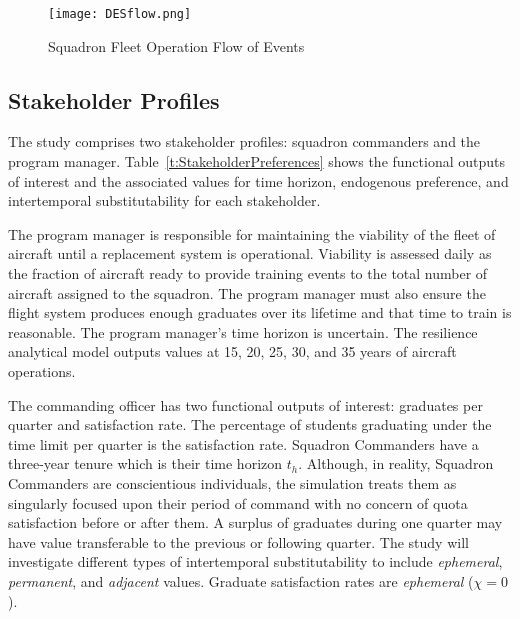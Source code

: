 



\begin{figure}[h]
  \centering\texttt{[image: DESflow.png]}
  \caption{Squadron Fleet Operation Flow of Events}
  \label{f:DESflow}
\end{figure}



\subsection{Stakeholder Profiles}

The study comprises two stakeholder profiles: squadron
commanders and the program manager. Table~\ref{t:StakeholderPreferences}
shows the functional outputs of interest and the associated values for
time horizon, endogenous preference, and intertemporal
substitutability for each stakeholder.

The program manager is responsible for maintaining the
viability of the fleet of aircraft until a replacement system is
operational. Viability is assessed daily as the fraction of 
aircraft ready to provide training events to the total number of aircraft
assigned to the squadron. The program manager must also ensure the flight system
produces enough graduates over its lifetime and that time to train is
reasonable. The program manager's time horizon is uncertain. The
resilience analytical model outputs values at 15, 20, 25, 30, and 35
years of aircraft operations.  

The commanding officer has two functional outputs of interest:
graduates per quarter and satisfaction rate. The
percentage of students graduating under the time limit per quarter is
the satisfaction rate. Squadron Commanders have a three-year
tenure which is their time horizon $t_h$. Although, in reality,
Squadron Commanders are conscientious 
individuals, the simulation treats them as singularly focused upon
their period of command with no concern of quota satisfaction before
or after them. A surplus of graduates during one quarter may have value
transferable to the previous or following quarter. The study will
investigate different types of intertemporal substitutability to include
\emph{ephemeral}, \emph{permanent}, and \emph{adjacent}
values. Graduate satisfaction rates are \emph{ephemeral} ($\chi = 0$).


